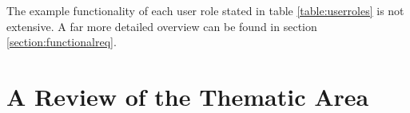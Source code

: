 The example functionality of each user role stated in table \ref{table:userroles} is not extensive. A far more detailed overview can be found in section \ref{section:functionalreq}.

\section{A Review of the Thematic Area}
\label{thematicreview}
